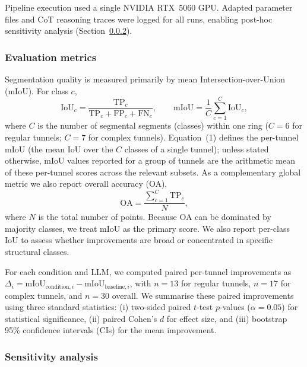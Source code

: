 \documentclass[a4paper,fleqn]{cas-dc}
\begin{document}
{Pipeline execution used a single NVIDIA RTX~5060 GPU. Adapted parameter files and CoT reasoning traces were logged for all runs, enabling post-hoc sensitivity analysis (Section~\ref{sec:sensitivity-method}).

\subsubsection{Evaluation metrics}\label{sec:metrics}

Segmentation quality is measured primarily by mean Intersection-over-Union (mIoU). For class $c$,
\begin{equation}
\text{IoU}_c = \frac{\text{TP}_c}{\text{TP}_c + \text{FP}_c + \text{FN}_c}, \qquad
\text{mIoU} = \frac{1}{C} \sum_{c=1}^{C} \text{IoU}_c,
\end{equation}
where $C$ is the number of segmental segments (classes) within one ring ($C=6$ for regular tunnels; $C=7$ for complex tunnels). Equation~(1) defines the per-tunnel mIoU (the mean IoU over the $C$ classes of a single tunnel); unless stated otherwise, mIoU values reported for a group of tunnels are the arithmetic mean of these per-tunnel scores across the relevant subsets. As a complementary global metric we also report overall accuracy (OA),
\begin{equation}
\text{OA} = \frac{\sum_{c=1}^{C} \text{TP}_c}{N},
\end{equation}
where $N$ is the total number of points. Because OA can be dominated by majority classes, we treat mIoU as the primary score. We also report per-class IoU to assess whether improvements are broad or concentrated in specific structural classes.

For each condition and LLM, we computed paired per-tunnel improvements as $\Delta_i = \mathrm{mIoU}_{\text{condition},i} - \mathrm{mIoU}_{\text{baseline},i}$, with $n=13$ for regular tunnels, $n=17$ for complex tunnels, and $n=30$ overall. We summarise these paired improvements using three standard statistics: (i) two-sided paired $t$-test $p$-values ($\alpha = 0.05$) for statistical significance, (ii) paired Cohen's \mbox{$d$} for effect size, and (iii) bootstrap 95\% confidence intervals (CIs) for the mean improvement.

\subsubsection{Sensitivity analysis}\label{sec:sensitivity-method}

}
\end{document}
